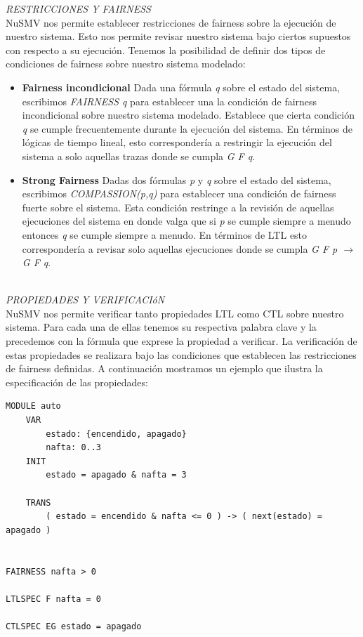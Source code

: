 \documentclass[titlepage, 12pt]{book}
\begin{document}
\textit{RESTRICCIONES Y FAIRNESS}\\

NuSMV nos permite establecer restricciones de fairness sobre la ejecuci\'on de nuestro sistema. Esto nos permite revisar nuestro sistema bajo ciertos supuestos con respecto a su ejecuci\'on. Tenemos la posibilidad de definir dos tipos de condiciones de fairness sobre nuestro sistema modelado:
\begin{itemize}

\item \textbf{Fairness incondicional} Dada una f\'ormula \textit{q} sobre el estado del sistema, escribimos \textit{FAIRNESS q} para establecer una la condici\'on de fairness incondicional sobre nuestro sistema modelado. Establece que cierta condici\'on \textit{q} se cumple frecuentemente durante la ejecuci\'on del sistema. En t\'erminos de l\'ogicas de tiempo lineal, esto corresponder\'ia a restringir la ejecuci\'on del sistema a solo aquellas trazas donde se cumpla \textit{G F q}.

\item \textbf{Strong Fairness} Dadas dos f\'ormulas \textit{p} y \textit{q} sobre el estado del sistema, escribimos \textit{COMPASSION(p,q)} para establecer una condici\'on de fairness fuerte sobre el sistema. Esta condici\'on restringe a la revisi\'on de aquellas ejecuciones del sistema en donde valga que si \textit{p} se cumple siempre a menudo entonces \textit{q} se cumple siempre a menudo. En t\'erminos de LTL esto corresponder\'ia a revisar solo aquellas ejecuciones donde se cumpla \textit{G F p $\rightarrow$ G F q}.

\end{itemize}

~\\
\textit{PROPIEDADES Y VERIFICACI\'oN}\\

NuSMV nos permite verificar tanto propiedades LTL como CTL sobre nuestro sistema. Para cada una de ellas tenemos su respectiva palabra clave y la precedemos con la f\'ormula que exprese la propiedad a verificar. La verificaci\'on de estas propiedades se realizara bajo las condiciones que establecen las restricciones de fairness definidas. A continuaci\'on mostramos un ejemplo que ilustra la especificaci\'on de las propiedades:

\begin{verbatim}
MODULE auto
    VAR
        estado: {encendido, apagado}
        nafta: 0..3
    INIT
        estado = apagado & nafta = 3

    TRANS
        ( estado = encendido & nafta <= 0 ) -> ( next(estado) = apagado )


FAIRNESS nafta > 0

LTLSPEC F nafta = 0

CTLSPEC EG estado = apagado

\end{verbatim}
\end{document}
